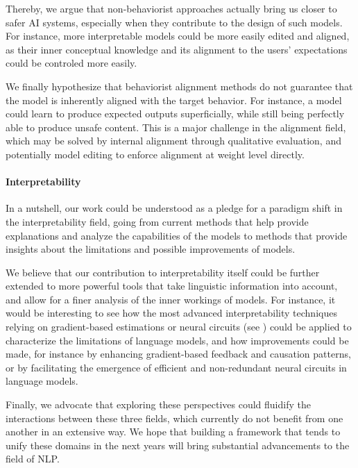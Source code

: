Thereby, we argue that non-behaviorist approaches actually bring us closer to safer AI systems, especially when they contribute to the design of such models. For instance, more interpretable models could be more easily edited and aligned, as their inner conceptual knowledge and its alignment to the users' expectations could be controled more easily.

We finally hypothesize that behaviorist alignment methods do not guarantee that the model is inherently aligned with the target behavior. For instance, a model could learn to produce expected outputs superficially, while still being perfectly able to produce unsafe content. This is a major challenge in the alignment field, which may be solved by internal alignment through qualitative evaluation, and potentially model editing to enforce alignment at weight level directly.

\paragraph{Interpretability}

In a nutshell, our work could be understood as a pledge for a paradigm shift in the interpretability field, going from current methods that help provide explanations and analyze the capabilities of the models to methods that provide insights about the limitations and possible improvements of models.

We believe that our contribution to interpretability itself could be further extended to more powerful tools that take linguistic information into account, and allow for a finer analysis of the inner workings of models. For instance, it would be interesting to see how the most advanced interpretability techniques relying on gradient-based estimations or neural circuits (see ) could be applied to characterize the limitations of language models, and how improvements could be made, for instance by enhancing gradient-based feedback and causation patterns, or by facilitating the emergence of efficient and non-redundant neural circuits in language models.

\vspace{2em}

Finally, we advocate that exploring these perspectives could fluidify the interactions between these three fields, which currently do not benefit from one another in an extensive way. We hope that building a framework that tends to unify these domains in the next years will bring substantial advancements to the field of NLP.
